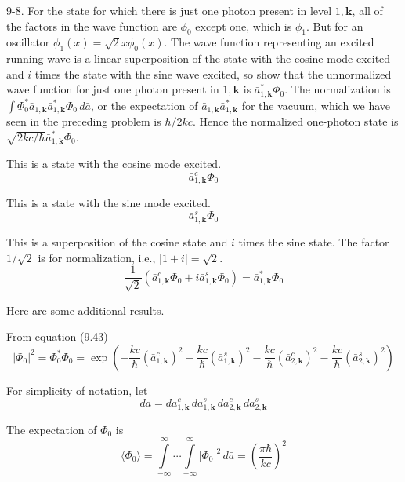\documentclass[12pt]{article}
\newcommand\U{\vert\Phi_0\vert^2}
\begin{document}
9-8.
For the state for which there is just one photon
present in level $1,\mathbf k$, all of the factors in the wave function are
$\phi_0$ except one, which is $\phi_1$.
But for an oscillator $\phi_1(x)=\sqrt2x\phi_0(x)$.
The wave function representing an excited running wave is a linear
superposition of the state with the cosine mode excited and $i$
times the state with the sine wave excited, so show that the
unnormalized wave function for just one photon present in
$1,\mathbf k$ is $\bar a_{1,\mathbf k}^*\Phi_0$.
The normalization is
$\int\Phi_0^*\bar a_{1,\mathbf k}\bar a_{1,\mathbf k}^*\Phi_0\,d\bar a$,
or the expectation of $\bar a_{1,\mathbf k}\bar a_{1,\mathbf k}^*$ for the
vacuum, which we have seen in the preceding problem is $\hbar/2kc$.
Hence the normalized one-photon state is
$\sqrt{2kc/\hbar}\bar a_{1,\mathbf k}^*\Phi_0$.

\bigskip
This is a state with the cosine mode excited.
\begin{equation*}
\bar a_{1,\mathbf k}^c\Phi_0
\end{equation*}

This is a state with the sine mode excited.
\begin{equation*}
\bar a_{1,\mathbf k}^s\Phi_0
\end{equation*}

This is a superposition of the cosine state and $i$ times the sine state.
The factor $1/\sqrt2$ is for normalization, i.e., $|1+i|=\sqrt2$.
\begin{equation*}
\frac{1}{\sqrt2}\left(\bar a_{1,\mathbf k}^c\Phi_0+i\bar a_{1,\mathbf k}^s\Phi_0\right)
=\bar a_{1,\mathbf k}^*\Phi_0
\end{equation*}

Here are some additional results.

\bigskip
From equation (9.43)
\begin{equation*}
\U=\Phi_0^*\Phi_0=\exp\left(
-\frac{kc}{\hbar}(\bar a_{1,\mathbf k}^c)^2-\frac{kc}{\hbar}(\bar a_{1,\mathbf k}^s)^2
-\frac{kc}{\hbar}(\bar a_{2,\mathbf k}^c)^2-\frac{kc}{\hbar}(\bar a_{2,\mathbf k}^s)^2
\right)
\end{equation*}

For simplicity of notation, let
\begin{equation*}
d\bar a=
d\bar a_{1,\mathbf k}^c\,d\bar a_{1,\mathbf k}^s
\,d\bar a_{2,\mathbf k}^c\,d\bar a_{2,\mathbf k}^s
\end{equation*}

The expectation of $\Phi_0$ is
\begin{equation*}
\langle\Phi_0\rangle=
\int\limits_{-\infty}^\infty\cdots
\int\limits_{-\infty}^\infty
\U\,d\bar a
=\left(\frac{\pi\hbar}{kc}\right)^2
\tag{1}
\end{equation*}
\end{document}
